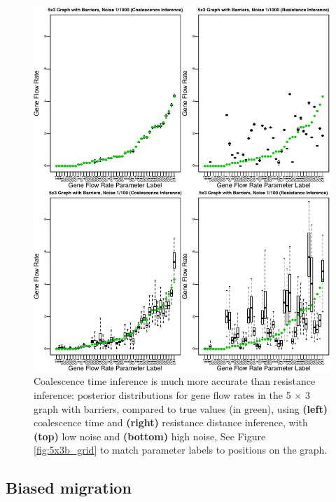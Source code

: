 \documentclass{article}
\begin{document}
\begin{figure}
\centering
     \includegraphics[scale=1]{figs/5x3b_post_coalvcom}
    \caption{
        Coalescence time inference is much more accurate than resistance inference:
        posterior distributions for gene flow rates in the 5 $\times$ 3 graph with barriers,
        compared to true values (in green),
        using \textbf{(left)} coalescence time and \textbf{(right)} resistance distance inference,
        with \textbf{(top)} low noise and \textbf{(bottom)} high noise,
        See Figure \ref{fig:5x3b_grid} to match parameter labels to positions on the graph.
    \label{fig:5x3b_post_coalvcom}
}
\end{figure}


\subsection*{Biased migration}
\label{sec:biased_migration}
\end{document}

